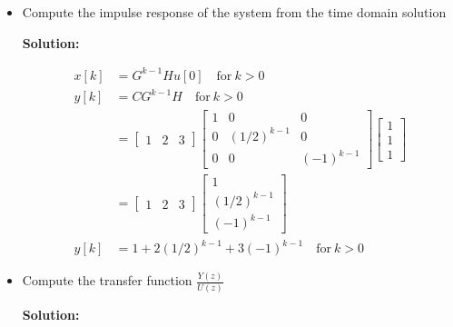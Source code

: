 \documentclass[twoside]{article}
\begin{document}
\begin{itemize}
\item Compute the impulse response of the system from the time domain
solution

\textbf{Solution:}

\begin{align*}
  x[k] &= G^{k-1} H u[0] \quad \mathrm{for} \  k > 0 \\
  y[k] &= C G^{k-1} H \quad \mathrm{for} \ k > 0 \\ 
         &= \left[ \begin{array}{ccc} 1 & 2 & 3 \end{array} \right] 
                \left[ \begin{array}{ccc} 1 & 0 & 0\\ 0 & (1/2)^{k-1} & 0
    \\ 0 & 0 & (-1)^{k-1} \end{array} \right]
      \left[ \begin{array}{c} 1 \\ 1 \\ 1\end{array} \right] 
\\
&= \left[ \begin{array}{ccc} 1 & 2 & 3 \end{array} \right] 
\left[ \begin{array}{c} 1 \\ (1/2)^{k-1} \\ (-1)^{k-1} \end{array}
  \right] 
\\
y[k] &= 1 + 2 (1/2)^{k-1} + 3 (-1)^{k-1} \quad \mathrm{for} \ k > 0 
\end{align*}    

\item Compute the transfer function $\frac{Y(z)}{U(z)}$

\textbf{Solution:}


\end{itemize}
\end{document}
